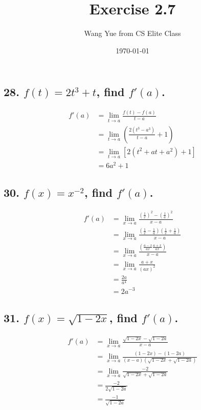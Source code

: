 \documentclass{article}
\begin{document}
    \title{Exercise 2.7}
    \author{Wang Yue from CS Elite Class}
    \date{\today}

    \maketitle
    
    \subsection*{28. $f(t) = 2t^3 + t$, find $f'(a)$.}

    $$
    \begin{aligned}
        f'(a) &= \lim_{t \to a}\frac{f(t) - f(a)}{t - a} \\
        &= \lim_{t \to a}(\frac{2(t^3 - a^3)}{t - a} + 1) \\
        &= \lim_{t \to a}[2(t^2 + at + a^2) + 1] \\
        &=  6a^2 + 1
    \end{aligned}
    $$

    \subsection*{30. $f(x) = x^{-2}$, find $f'(a)$.}

    $$
    \begin{aligned}
        f'(a) &= \lim_{x \to a}\frac{(\frac 1 x)^2 - (\frac 1 a)^2}{x - a} \\
        &= \lim_{x \to a}\frac{(\frac 1 x - \frac 1 a)(\frac 1 x + \frac 1 a)}{x - a} \\
        &= \lim_{x \to a}\frac{(\frac{a - x}{ax} \frac{a+x}{ax})}{x - a} \\
        &= \lim_{x \to a}\frac{a+x}{(ax)^2} \\
        &= \frac{2a}{a^4} \\
        &= 2a^{-3}
    \end{aligned}
    $$

    \subsection*{31. $f(x) = \sqrt{1 - 2x}$, find $f'(a)$.}

    $$
    \begin{aligned}
        f'(a) &= \lim_{x \to a}\frac{\sqrt{1 - 2x} - \sqrt{1 - 2a}}{x - a} \\
        &= \lim_{x \to a}\frac{(1 - 2x) - (1 - 2a)}{(x - a)(\sqrt{1 - 2x} + \sqrt{1 - 2a})} \\
        &= \lim_{x \to a}\frac{-2}{\sqrt{1 - 2x} + \sqrt{1 - 2a}} \\
        &= \frac{-2}{2\sqrt{1 - 2a}} \\
        &= \frac{-1}{\sqrt{1 - 2a}}
    \end{aligned}
    $$
\end{document}
